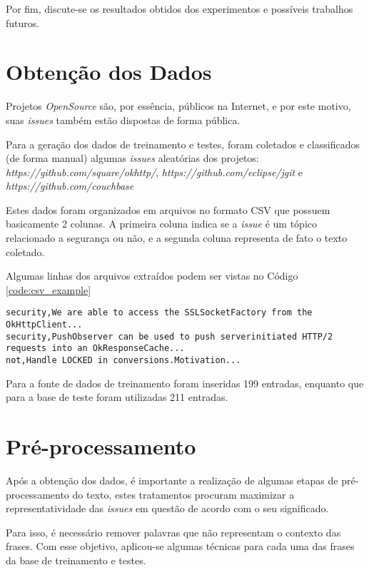 \documentclass[conference]{IEEEtran}
\begin{document}
Por fim, discute-se os resultados obtidos dos experimentos e possíveis trabalhos futuros.

\section{Obtenção dos Dados}

Projetos \textit{OpenSource} são, por essência, públicos na Internet, e por este motivo, suas \textit{issues} também estão dispostas de forma pública.

Para a geração dos dados de treinamento e testes, foram coletados e classificados (de forma manual) algumas \textit{issues} aleatórias dos projetos: \textit{https://github.com/square/okhttp/}, \textit{https://github.com/eclipse/jgit} e \textit{https://github.com/couchbase}

Estes dados foram organizados em arquivos no formato CSV que possuem basicamente 2 colunas. A primeira coluna indica se a \textit{issue} é um tópico relacionado a segurança ou não, e a segunda coluna representa de fato o texto coletado.

Algumas linhas dos arquivos extraídos podem ser vistas no Código \ref{code:csv_example}

\begin{lstlisting}[caption={CSV Exemplo com Base de Dados},captionpos=b,frame=single,label={code:csv_example}]
security,We are able to access the SSLSocketFactory from the OkHttpClient...
security,PushObserver can be used to push serverinitiated HTTP/2 requests into an OkResponseCache...
not,Handle LOCKED in conversions.Motivation...
\end{lstlisting}

Para a fonte de dados de treinamento foram inseridas 199 entradas, enquanto que para a base de teste foram utilizadas 211 entradas.

\section{Pré-processamento}

Após a obtenção dos dados, é importante a realização de algumas etapas de pré-processamento do texto, estes tratamentos procuram maximizar a representatividade das \textit{issues} em questão de acordo com o seu significado.

Para isso, é necessário remover palavras que não representam o contexto das frases. Com esse objetivo, aplicou-se algumas técnicas para cada uma das frases da base de treinamento e testes.
\end{document}
